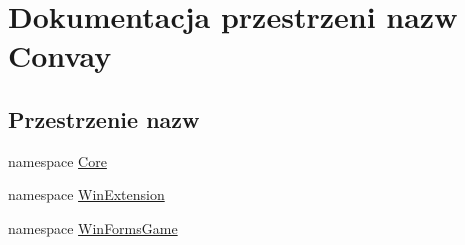 \hypertarget{namespace_convay}{}\section{Dokumentacja przestrzeni nazw Convay}
\label{namespace_convay}
\subsection*{Przestrzenie nazw}
\begin{DoxyCompactItemize}
\item 
namespace \hyperlink{namespace_convay_1_1_core}{Core}
\item 
namespace \hyperlink{namespace_convay_1_1_win_extension}{Win\+Extension}
\item 
namespace \hyperlink{namespace_convay_1_1_win_forms_game}{Win\+Forms\+Game}
\end{DoxyCompactItemize}

